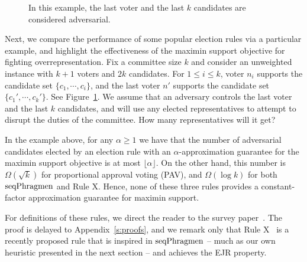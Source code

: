 \begin{figure}[htb]
\begin{minipage}[c]{0.40\linewidth}
{
}
  \caption{In this example, the last voter and the last $k$ candidates are considered adversarial.}
  \label{fig:example}
\end{minipage}%
\end{figure}

Next, we compare the performance of some popular election rules via a particular example, and highlight the effectiveness of the maximin support objective for fighting overrepresentation. 
Fix a committee size $k$ and consider an unweighted instance with $k+1$ voters and $2k$ candidates. 
For $1\leq i\leq k$, voter $n_i$ supports the candidate set $\{c_1, \cdots, c_i\}$, and the last voter $n'$ supports the candidate set $\{c_1', \cdots, c_k'\}$. See Figure~\ref{fig:example}.
%
We assume that an adversary controls the last voter and the last $k$ candidates, and will use any elected representatives to attempt to disrupt the duties of the committee. 
How many representatives will it get? 

\begin{lemma}\label{lem:badexamples}
In the example above, for any $\alpha \geq 1$ we have that the number of adversarial candidates elected by an election rule with an $\alpha$-approximation guarantee for the maximin support objective is at most $\lfloor \alpha \rfloor$. 
On the other hand, this number is $\Omega(\sqrt{k})$ for proportional approval voting (PAV), and $\Omega(\log k)$ for both $\operatorname{seqPhragmen}$ and Rule X. 
Hence, none of these three rules provides a constant-factor approximation guarantee for maximin support. 
\end{lemma}

For definitions of these rules, we direct the reader to the survey paper~\cite{lackner2020approval}.
The proof is delayed to Appendix~\ref{s:proofs}, and we remark only that Rule X~\cite{peters2019proportionality} is a recently proposed rule that is inspired in $\operatorname{seqPhragmen}$ -- much as our own heuristic presented in the next section -- and achieves the EJR property. 

